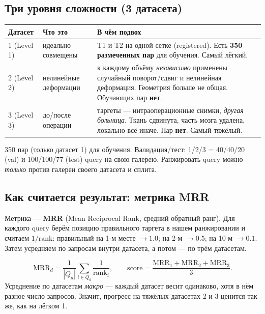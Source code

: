 \documentclass[11pt,a4paper]{article}
\begin{document}
\subsection{Три уровня сложности (3 датасета)}

\begin{center}\small
\begin{tabularx}{\linewidth}{@{}l l X@{}}\toprule
\textbf{Датасет} & \textbf{Что это} & \textbf{В чём подвох}\\\midrule
1 (Level 1) & идеально совмещены & T1 и T2 на одной сетке (registered). Есть \textbf{350 размеченных пар} для обучения. Самый лёгкий.\\
2 (Level 2) & нелинейные деформации & к каждому объёму \emph{независимо} применены случайный поворот/сдвиг и нелинейная деформация. Геометрия больше не общая. Обучающих пар \textbf{нет}.\\
3 (Level 3) & до/после операции & таргеты — интраоперационные снимки, \emph{другая больница}. Ткань сдвинута, часть мозга удалена, локально всё иначе. Пар \textbf{нет}. Самый тяжёлый.\\
\bottomrule\end{tabularx}\end{center}

\begin{note}[Данные]
350 пар (только датасет 1) для обучения. Валидация/тест: 1/2/3 = 40/40/20 (val) и 100/100/77
(test) query на свою галерею. Ранжировать query можно \emph{только} против галереи своего
датасета и сплита.
\end{note}

\subsection{Как считается результат: метрика MRR}

Метрика — \textbf{MRR} (Mean Reciprocal Rank, средний обратный ранг). Для каждого query берём
позицию правильного таргета в нашем ранжировании и считаем $1/\text{rank}$: правильный на 1-м
месте $\to 1.0$; на 2-м $\to 0.5$; на 10-м $\to 0.1$. Затем усредняем по запросам внутри датасета,
а потом — по трём датасетам.

\begin{mathidea}
\[
\mathrm{MRR}_d=\frac{1}{|Q_d|}\sum_{i\in Q_d}\frac{1}{\mathrm{rank}_i},
\qquad
\text{score}=\frac{\mathrm{MRR}_1+\mathrm{MRR}_2+\mathrm{MRR}_3}{3}.
\]
Усреднение по датасетам \emph{макро} — каждый датасет весит одинаково, хотя в нём разное число
запросов. Значит, прогресс на тяжёлых датасетах 2 и 3 ценится так же, как на лёгком 1.
\end{mathidea}
\end{document}

